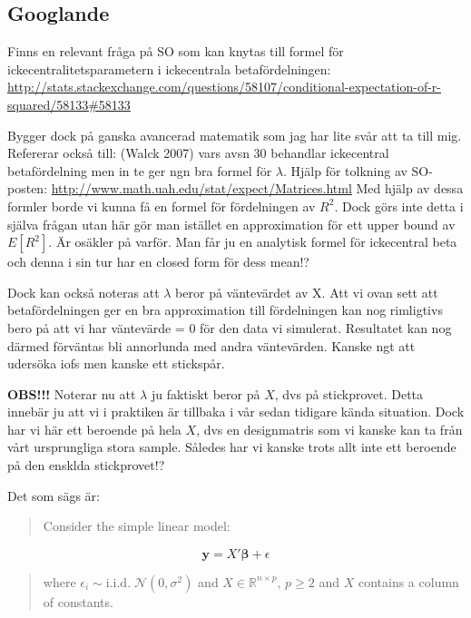 \documentclass[]{article}
\begin{document}
\subsection{Googlande}\label{googlande}

Finns en relevant fråga på SO som kan knytas till formel för
ickecentralitetsparametern i ickecentrala betafördelningen:
\url{http://stats.stackexchange.com/questions/58107/conditional-expectation-of-r-squared/58133\#58133}

Bygger dock på ganska avancerad matematik som jag har lite svår att ta
till mig. Refererar också till: (Walck 2007) vars avsn 30 behandlar
ickecentral betafördelning men in te ger ngn bra formel för \(\lambda\).
Hjälp för tolkning av SO-posten:
\url{http://www.math.uah.edu/stat/expect/Matrices.html} Med hjälp av
dessa formler borde vi kunna få en formel för fördelningen av \(R^2\).
Dock görs inte detta i själva frågan utan här gör man istället en
approximation för ett upper bound av \(E[R^2]\). Är osäkler på varför.
Man får ju en analytisk formel för ickecentral beta och denna i sin tur
har en closed form för dess mean!?

Dock kan också noteras att \(\lambda\) beror på väntevärdet av X. Att vi
ovan sett att betafördelningen ger en bra approximation till
fördelningen kan nog rimligtivs bero på att vi har väntevärde = 0 för
den data vi simulerat. Resultatet kan nog därmed förväntas bli
annorlunda med andra väntevärden. Kanske ngt att udersöka iofs men
kanske ett stickspår.

\textbf{OBS!!!} Noterar nu att \(\lambda\) ju faktiskt beror på \(X\),
dvs på stickprovet. Detta innebär ju att vi i praktiken är tillbaka i
vår sedan tidigare kända situation. Dock har vi här ett beroende på hela
\(X\), dvs en designmatris som vi kanske kan ta från vårt ursprungliga
stora sample. Således har vi kanske trots allt inte ett beroende på den
ensklda stickprovet!?

Det som sägs är:

\begin{quote}
Consider the simple linear model:
\end{quote}

\[\pmb{y}=X'\pmb{\beta}+\epsilon\]

\begin{quote}
where \(\epsilon_i\sim\mathrm{i.i.d.}\;\mathcal{N}(0,\sigma^2)\) and
\(X\in\mathbb{R}^{n\times p}\), \(p\geq2\) and \(X\) contains a column
of constants.
\end{quote}
\end{document}
